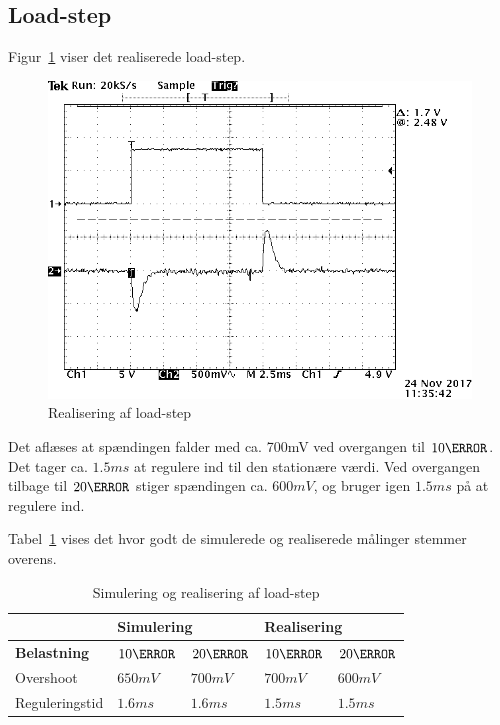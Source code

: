 \subsection{Load-step}
Figur~\ref{fig:belastningsamlet} viser det realiserede load-step.
\begin{figure}[H]
	\center
	\includegraphics[max width=0.7\linewidth]{../dokumentation/tex/2iteration/billeder/Realisering/belastningsamlet.png}
	\caption{Realisering af load-step}
	\label{fig:belastningsamlet}
\end{figure}
\noindent Det aflæses at spændingen falder med ca. 700mV ved overgangen til $10\ohm$. Det tager ca. $1.5ms$ at regulere ind til den stationære værdi. Ved overgangen tilbage til $20\ohm$ stiger spændingen ca. $600mV$, og bruger igen $1.5ms$ på at regulere ind.

\noindent Tabel~\ref{tab:Loadstep} vises det hvor godt de simulerede og realiserede målinger stemmer overens.
\begin{table}[H] 			
	\centering
	\begin{tabularx}{\textwidth}{|X|l|l|l|l|}
		\hline
		& \multicolumn{2}{|l|}{\textbf{Simulering}} & \multicolumn{2}{|l|}{\textbf{Realisering}} \\ \hline
		\textbf{Belastning} & $10\ohm$ & $20\ohm$ & $10\ohm$ & $20\ohm$ \\ \hline
		Overshoot & $650mV$ & $700mV$ & $700mV$ & $600mV$  \\ \hline
		Reguleringstid & $1.6ms$ & $1.6ms$ & $1.5ms$ & $1.5ms$ \\ \hline
	\end{tabularx}
	\caption{Simulering og realisering af load-step}
	\label{tab:Loadstep}
\end{table}